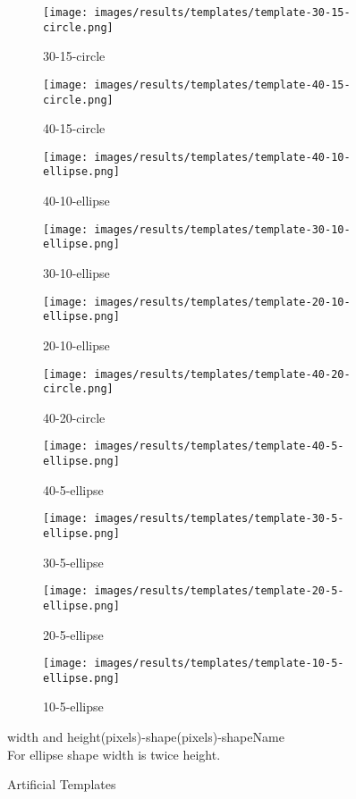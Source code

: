\begin{figure}[H]
\begin{subfigure}{.25\textwidth}
    \texttt{[image: images/results/templates/template-30-15-circle.png]}
    \caption{30-15-circle}
\end{subfigure}%
\begin{subfigure}{.25\textwidth}
\centering
    \texttt{[image: images/results/templates/template-40-15-circle.png]}
    \caption{40-15-circle}
\end{subfigure}
\begin{subfigure}{.25\textwidth}
\centering
    \texttt{[image: images/results/templates/template-40-10-ellipse.png]}
    \caption{40-10-ellipse}
\end{subfigure}%
\begin{subfigure}{.25\textwidth}
\centering
    \texttt{[image: images/results/templates/template-30-10-ellipse.png]}
    \caption{30-10-ellipse}
\end{subfigure}%
\begin{subfigure}{.25\textwidth}
\centering
    \texttt{[image: images/results/templates/template-20-10-ellipse.png]}
    \caption{20-10-ellipse}
\end{subfigure}%
\begin{subfigure}{.25\textwidth}
\centering
    \texttt{[image: images/results/templates/template-40-20-circle.png]}
    \caption{40-20-circle}
\end{subfigure}
\begin{subfigure}{.25\textwidth}
\centering
    \texttt{[image: images/results/templates/template-40-5-ellipse.png]}
    \caption{40-5-ellipse}
\end{subfigure}%
\begin{subfigure}{.25\textwidth}
\centering
    \texttt{[image: images/results/templates/template-30-5-ellipse.png]}
    \caption{30-5-ellipse}
\end{subfigure}%
\begin{subfigure}{.25\textwidth}
\centering
    \texttt{[image: images/results/templates/template-20-5-ellipse.png]}
    \caption{20-5-ellipse}
\end{subfigure}%
\begin{subfigure}{.25\textwidth}
\centering
    \texttt{[image: images/results/templates/template-10-5-ellipse.png]}
    \caption{10-5-ellipse}
\end{subfigure}

    \caption{Artificial Templates }
    \medskip
    \small
    width and height(pixels)-shape(pixels)-shapeName \\ For ellipse shape width is twice height.
    \label{fig:Artifical-templates}
\end{figure}

